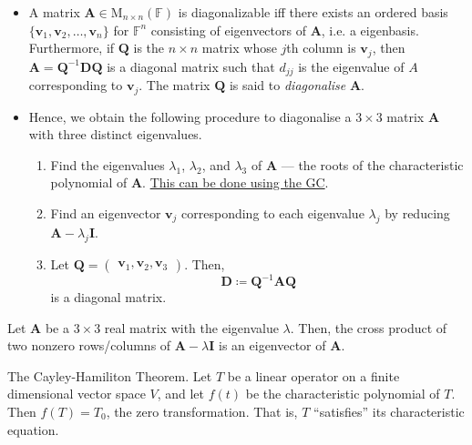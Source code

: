 \documentclass[../Notes.tex]{subfiles}
\begin{document}
\begin{stbox}{}
    \begin{itemize}
        \item A matrix \(\mathbf{A}\in\mathrm{M}_{n\times n}(\mathbb{F})\) is diagonalizable iff there exists an ordered basis \(\{\mathbf{v}_1,\mathbf{v}_2,\dots,\mathbf{v}_n\}\) for \(\mathbb{F}^n\) consisting of eigenvectors of \(\mathbf{A}\), i.e. a eigenbasis. Furthermore, if \(\mathbf{Q}\) is the \(n\times n\) matrix whose \(j\)th column is \(\mathbf{v}_j\), then \(\mathbf{A}=\mathbf{Q}^{-1}\mathbf{D}\mathbf{Q}\) is a diagonal matrix such that \(d_{jj}\) is the eigenvalue of \(A\) corresponding to \(\mathbf{v}_j\). The matrix \(\mathbf{Q}\) is said to \emph{diagonalise} \(\mathbf{A}\).
        \item Hence, we obtain the following procedure to diagonalise a \(3\times 3\) matrix \(\mathbf{A}\) with three distinct eigenvalues.
        \begin{enumerate}
            \item Find the eigenvalues \(\lambda_1\), \(\lambda_2\), and \(\lambda_3\) of \(\mathbf{A}\) --- the roots of the characteristic polynomial of \(\mathbf{A}\). \hyperlink{characteristic-polynomial-roots}{This can be done using the GC}.
            \item Find an eigenvector \(\mathbf{v}_j\) corresponding to each eigenvalue \(\lambda_j\) by reducing \(\mathbf{A}-\lambda_j\mathbf{I}
            \).
            \item Let \(\mathbf{Q}=
            \begin{pmatrix}
                \mathbf{v}_1,\mathbf{v}_2,\mathbf{v}_3
            \end{pmatrix}\). Then,
            \[\mathbf{D}\coloneq \mathbf{Q}^{-1}\mathbf{A}\mathbf{Q}\]
            is a diagonal matrix.
        \end{enumerate} 
    \end{itemize}    
\end{stbox}
\begin{note}
    Let \(\mathbf{A}\) be a \(3\times 3\) real matrix with the eigenvalue \(\lambda\). Then, the cross product of two nonzero rows/columns of \(\mathbf{A}-\lambda \mathbf{I}\) is an eigenvector of \(\mathbf{A}\).
\end{note}
\begin{theorem}{The Cayley-Hamiliton Theorem.}{}
    Let \(T\) be a linear operator on a finite dimensional vector space \(V\), and let \(f(t)\) be the characteristic polynomial of \(T\). Then \(f(T)=T_0\), the zero transformation. That is, \(T\) ``satisfies'' its characteristic equation.
\end{theorem}
\end{document}
